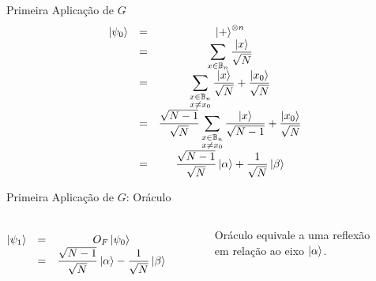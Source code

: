 \documentclass[
    12pt,
    xcolor={svgnames},
]{beamer}
\begin{document}
    \begin{frame}{Primeira Aplicação de $G$}
        \[
        \begin{matrix}
            \ket{\psi_0} &=& \ket{+}^{\otimes n} \\
            &=& \displaystyle\sum_{x \in \mathbb{B}_n} \dfrac{\ket{x}}{\sqrt{N}} \\
            &=& \displaystyle\sum_{\substack{x \in \mathbb{B}_n \\ x \ne x_0}}\dfrac{\ket{x}}{\sqrt{N}} + \dfrac{\ket{x_0}}{\sqrt{N}} \\
            &=& \dfrac{\sqrt{N - 1}}{\sqrt{N}}\displaystyle\sum_{\substack{x \in \mathbb{B}_n \\ x \ne x_0}}\dfrac{\ket{x}}{\sqrt{N - 1}} + \dfrac{\ket{x_0}}{\sqrt{N}} \\
            &=& \dfrac{\sqrt{N - 1}}{\sqrt{N}} \ket{\alpha} + \dfrac{1}{\sqrt{N}} \ket{\beta}
        \end{matrix}
        \]
    \end{frame}

    \begin{frame}{Primeira Aplicação de $G$: Oráculo}
        \begin{columns}
        \[
        \begin{matrix}
            \ket{\psi_1} &=& O_F \ket{\psi_0} \\
            &=& \dfrac{\sqrt{N - 1}}{\sqrt{N}} \ket{\alpha} - \dfrac{1}{\sqrt{N}} \ket{\beta}
        \end{matrix}
        \]

        \begin{figure}
            
            \caption{Oráculo equivale a uma reflexão em relação ao eixo $\ket{\alpha}$.}
            \label{fig:oracle}
        \end{figure}
        \end{columns}
    \end{frame}
\end{document}
